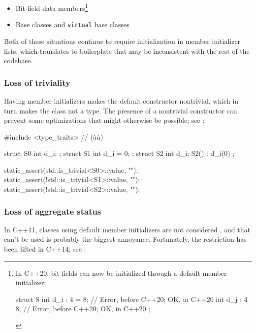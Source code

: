 \begin{itemize}
\item{Bit-field data members\cprotect\footnote{In C++20, bit fields can now be initialized through a default member initializer:
\begin{emcppslisting}[style=footcode]
struct S
{
    int d_i : 4 = 8;  // Error, before C++20; OK, in C++20
    int d_j : 4 {8};  // Error, before C++20; OK, in C++20
};
\end{emcppslisting}
    }}
\item{Base classes and \lstinline!virtual! base classes}
\end{itemize}

Both of these situations continue to require initialization in member
initializer lists, which translates to boilerplate that may be
inconsistent with the rest of the codebase.

\subsubsection[Loss of triviality]{Loss of triviality}\label{loss-of-triviality}

Having member initializers makes the default constructor nontrivial,
which in turn makes the class not a  type.
The presence of a nontrivial constructor can prevent some optimizations
that might otherwise be possible; see :

\begin{emcppslisting}
#include <type_traits>  // (ù{}ù)

struct S0 { int d_i;     };
struct S1 { int d_i = 0; };
struct S2 { int d_i; S2() : d_i(0) { } };

static_assert(std::is_trivial<S0>::value, "");
static_assert(!std::is_trivial<S1>::value, "");
static_assert(!std::is_trivial<S2>::value, "");
\end{emcppslisting}
    

\subsubsection[Loss of aggregate status]{Loss of aggregate status}\label{loss-of-aggregate-status}

In C++11, classes using default member initializers are not considered
, and that  can't be
used is probably the biggest annoyance. Fortunately, the restriction has
been lifted in C++14; see :

